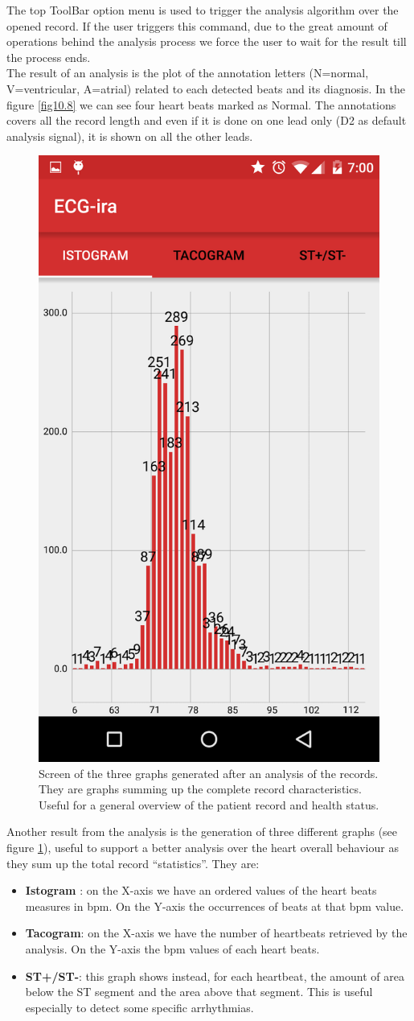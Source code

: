 The top ToolBar option menu is used to trigger the analysis algorithm over the opened record. If the user triggers this command, due to the great amount of operations behind the analysis process we force the user to wait for the result till the process ends.\\
The result of an analysis is the plot of the annotation letters (N=normal, V=ventricular, A=atrial) related to each detected beats and its diagnosis. In the figure \ref{fig10.8} we can see four heart beats marked as Normal. The annotations covers all the record length and even if it is done on one lead only (D2 as default analysis signal), it is shown on all the other leads.\\
\begin{figure}
\centering
\includegraphics[width=0.3\linewidth]{figures/ch10/9.png}
	\caption{Screen of the three graphs generated after an analysis of the records. They are graphs summing up the complete record characteristics. Useful for a general overview of the patient record and health status.}  
	\label{fig10.9}
\end{figure}
Another result from the analysis is the generation of three different graphs (see figure \ref{fig10.9}), useful to support a better analysis over the heart overall behaviour as they sum up the total record “statistics”. They are:
\begin{itemize}
\item \textbf{Istogram} : on the X-axis we have an ordered values of the heart beats measures in bpm. On the Y-axis the occurrences of beats at that bpm value.
\item \textbf{Tacogram}: on the X-axis we have the number of heartbeats retrieved by the analysis. On the Y-axis the bpm values of each heart beats. 
\item \textbf{ST+/ST-}: this graph shows instead, for each heartbeat, the amount of area below the ST segment and the area above that segment. This is useful especially to detect some specific arrhythmias.
\end{itemize}
